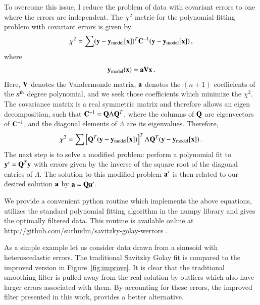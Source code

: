 \documentclass[iop, apj, onecolumn]{emulateapj}
\begin{document}
To overcome this issue, I reduce the problem of data with covariant errors to
one where the errors are independent. The $\chi^2$ metric for the polynomial
fitting problem with covariant errors is given by
\begin{equation}
        \chi^2 = \sum ({\bf y}-{\bf y}_{\rm model}[{\bf x}])^T {\bf C}^{-1}
        ({\bf y}-{\bf y}_{\rm model}[{\bf x}])\,,
\end{equation}
where
\begin{equation} 
        {\bf y}_{\rm model}({\bf x}) = {\bf a} {\bf V} {\bf x}\,.
\end{equation}
Here, ${\bf V}$ denotes the Vandermonde matrix, ${\bf a}$ denotes the $(n+1)$
coefficients of the $n^{\rm th}$ degree polynomial, and we seek those
coefficients which minimize the $\chi^2$.  The covariance matrix is a real
symmetric matrix and therefore allows an eigen decomposition, such that ${\bf
C}^{-1} = {\bf Q} \Lambda {\bf Q}^T$, where the columns of ${\bf Q}$ are
eigenvectors of ${\bf C}^{-1}$, and the diagonal elements of $\Lambda$ are its
eigenvalues. Therefore,
\begin{equation}
\chi^2 = \sum \left[{\bf Q}^T({\bf y}-{\bf y}_{\rm model}[{\bf x}])\right]^T
\Lambda {\bf Q}^T({\bf y}-{\bf y}_{\rm model}[{\bf x}])\,.
\end{equation}
The next step is to solve a modified problem: perform a polynomial fit to ${\bf
y'}={\bf Q}^T{\bf y}$ with errors given by the inverse of the square root of the
diagonal entries of $\Lambda$. The solution to this modified problem ${\bf a'}$
is then related to our desired solution ${\bf a}$ by ${\bf a}={\bf Q}{\bf a'}$.

We provide a convenient python routine which implements the above equations,
utilizes the standard polynomial fitting algorithm in the numpy library and
gives the optimally filtered data. This routine is available online at http://github.com/surhudm/savitzky-golay-werrors .

As a simple example let us consider data drawn from a sinusoid with
heteroscedastic errors. The traditional Savitzky Golay fit is compared to the
improved version in Figure~\ref{fig:improve}. It is clear that the traditional
smoothing filter is pulled away from the real solution by outliers which also
have larger errors associated with them. By accounting for these errors, the
improved filter presented in this work, provides a better alternative.
\end{document}
